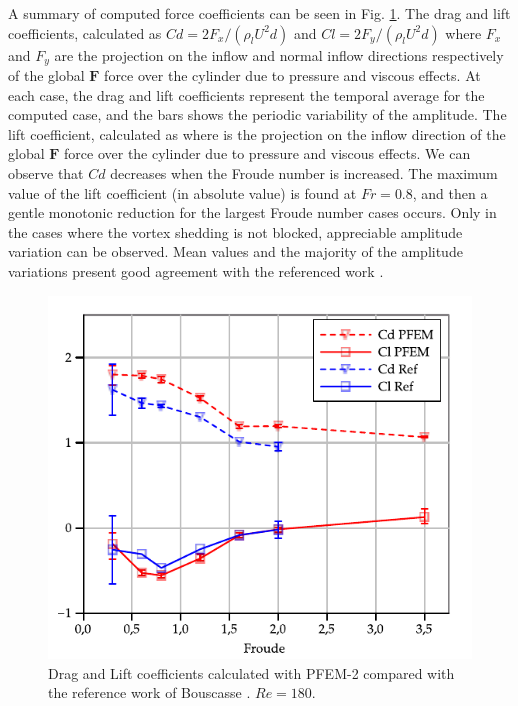A summary of computed force coefficients can be seen in Fig. \ref{fg:CdCl}. The drag and lift coefficients, calculated as $Cd=2 F_x/(\rho_l U^2 d)$ and $Cl=2 F_y/(\rho_l U^2 d)$ where $F_x$ and $F_y$ are the projection on the inflow and normal inflow directions respectively of the global $\mathbf{F}$ force over the cylinder due to pressure and viscous effects. At each case, the drag and lift coefficients represent the temporal average for the computed case, and the bars shows the periodic variability of the amplitude. The lift coefficient, calculated as where  is the projection on the inflow direction of the global $\mathbf{F}$ force over the cylinder due to pressure and viscous effects. We can observe that $Cd$ decreases when the Froude number is increased. The maximum value of the lift coefficient (in absolute value) is found at $Fr = 0.8$, and then a gentle monotonic reduction for the largest Froude number cases occurs. Only in the cases where the vortex shedding is not blocked, appreciable amplitude variation can be observed. Mean values and the majority of the amplitude variations present good agreement with the referenced work \cite{Bouscasse14}.

\begin{figure}[ht]
  \centering
  \includegraphics[width=0.95\columnwidth]{images_10thspheric/CdCl_Re180_hd_0_55.pdf}
  \caption{Drag and Lift coefficients calculated with PFEM-2 compared with the reference work of Bouscasse \cite{Bouscasse14}. $Re=180$.} %
  \label{fg:CdCl}
\end{figure}

